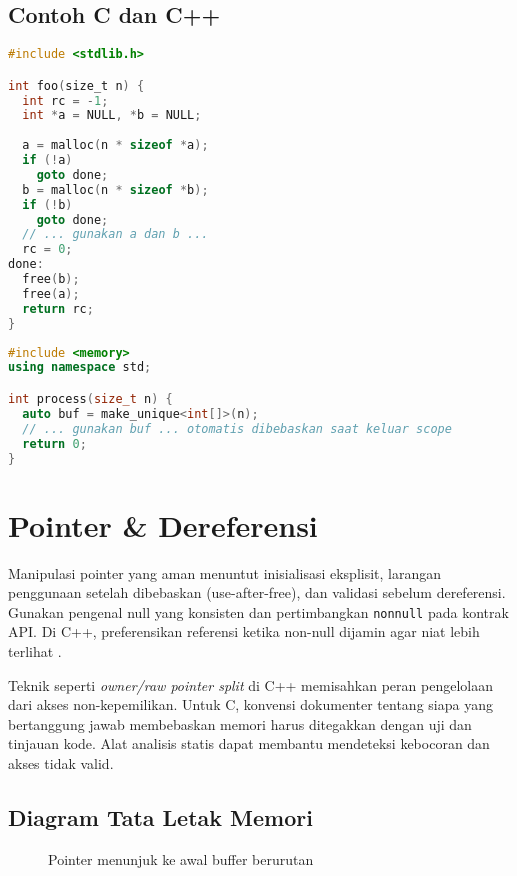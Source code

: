 \documentclass[../main.tex]{subfiles}
\begin{document}
\subsection{Contoh C dan C++}
\begin{lstlisting}[language=C, caption={Pola cleanup bertahap di C}]
#include <stdlib.h>

int foo(size_t n) {
  int rc = -1;
  int *a = NULL, *b = NULL;
  
  a = malloc(n * sizeof *a);
  if (!a)
    goto done;
  b = malloc(n * sizeof *b);
  if (!b)
    goto done;
  // ... gunakan a dan b ...
  rc = 0;
done:
  free(b);
  free(a);
  return rc;
}
\end{lstlisting}

\begin{lstlisting}[language=C++, caption={RAII dengan unique\_ptr di C++}]
#include <memory>
using namespace std;

int process(size_t n) {
  auto buf = make_unique<int[]>(n);
  // ... gunakan buf ... otomatis dibebaskan saat keluar scope
  return 0;
}
\end{lstlisting}

\section{Pointer \& Dereferensi}
Manipulasi pointer yang aman menuntut inisialisasi eksplisit, larangan penggunaan setelah dibebaskan (use-after-free), dan validasi sebelum dereferensi. Gunakan pengenal null yang konsisten dan pertimbangkan \texttt{nonnull} pada kontrak API. Di C++, preferensikan referensi ketika non-null dijamin agar niat lebih terlihat \parencite{gnu-c-manual,cpp-reference}.

Teknik seperti \emph{owner/raw pointer split} di C++ memisahkan peran pengelolaan dari akses non-kepemilikan. Untuk C, konvensi dokumenter tentang siapa yang bertanggung jawab membebaskan memori harus ditegakkan dengan uji dan tinjauan kode. Alat analisis statis dapat membantu mendeteksi kebocoran dan akses tidak valid.

\subsection{Diagram Tata Letak Memori}
\begin{figure}[H]
  \centering
  \caption{Pointer menunjuk ke awal buffer berurutan}
\end{figure}
\end{document}
